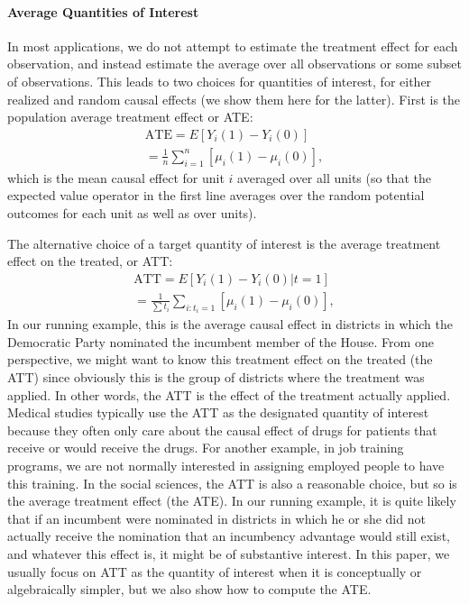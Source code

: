 \documentclass[11pt,titlepage]{article}
\begin{document}
\paragraph{Average Quantities of Interest}
In most applications, we do not attempt to estimate the treatment
effect for each observation, and instead estimate the average over all
observations or some subset of observations.  This leads to two
choices for quantities of interest, for either realized and random
causal effects (we show them here for the latter).  First is the
population average treatment effect or ATE:
\begin{align}
  \label{pate}
  \text{ATE} = E[Y_i(1) - Y_i(0)] \\
  = \frac{1}{n}\sum_{i=1}^n[\mu_i(1) - \mu_i(0)],
\end{align}
which is the mean causal effect for unit $i$ averaged over all units
(so that the expected value operator in the first line averages over
the random potential outcomes for each unit as well as over units).

The alternative choice of a target quantity of interest is the average
treatment effect on the treated, or ATT:
\begin{align}
  \label{att}
  \text{ATT} = E[Y_i(1) - Y_i(0)|t=1] \\
  = \frac{1}{\sum t_i}\sum_{i:t_i=1}[\mu_i(1) - \mu_i(0)],
\end{align}
In our running example, this is the average causal effect in districts
in which the Democratic Party nominated the incumbent member of the
House.  From one perspective, we might want to know this treatment
effect on the treated (the ATT) since obviously this is the group of
districts where the treatment was applied.  In other words, the ATT is
the effect of the treatment actually applied.  Medical studies
typically use the ATT as the designated quantity of interest because
they often only care about the causal effect of drugs for patients
that receive or would receive the drugs.  For another example, in job
training programs, we are not normally interested in assigning
employed people to have this training.  In the social sciences, the
ATT is also a reasonable choice, but so is the average treatment
effect (the ATE).  In our running example, it is quite likely that if
an incumbent were nominated in districts in which he or she did not
actually receive the nomination that an incumbency advantage would
still exist, and whatever this effect is, it might be of substantive
interest.  In this paper, we usually focus on ATT as the quantity of
interest when it is conceptually or algebraically simpler, but we also
show how to compute the ATE.
\end{document}
